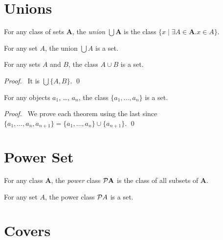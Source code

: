 \section{Unions}

\begin{definition}[Union]
    For any class of sets $\mathbf{A}$, the \emph{union} $\bigcup \mathbf{A}$
    is the class $\{x \mid \exists A \in \mathbf{A}. x \in A \}$.
\end{definition}

\begin{axiom}
    For any set $A$, the union $\bigcup A$ is a set.
\end{axiom}

\begin{theorem}
    \label{theorem:union}
    For any sets $A$ and $B$, the class $A \cup B$ is a set.
\end{theorem}

\begin{proof}
    \pf\ It is $\bigcup \{ A, B \}$. \qed
\end{proof}

\begin{theorems}
    For any objects $a_1$, \ldots, $a_n$, the class $\{ a_1, \ldots, a_n \}$
    is a set.
\end{theorems}

\begin{proof}
    \pf\ We prove each theorem using the last since
    $\{ a_1, \ldots, a_n, a_{n+1} \} = \{ a_1, \ldots, a_n \} \cup \{ a_{n+1} \}$. \qed
\end{proof}

\section{Power Set}

\begin{definition}
    For any class $\mathbf{A}$, the \emph{power} class $\mathcal{P} \mathbf{A}$
    is the class of all subsets of $\mathbf{A}$.
\end{definition}

\begin{axiom}
    For any set $A$, the power class $\mathcal{P} A$ is a set.
\end{axiom}

\section{Covers}

